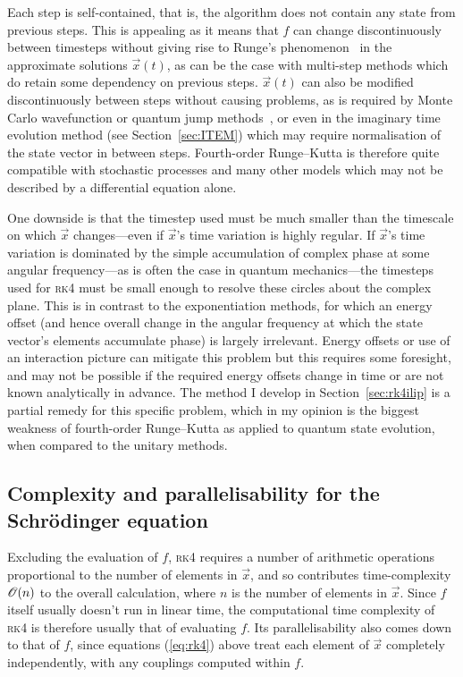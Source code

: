Each step is self-contained, that is, the algorithm does not contain any state from previous steps. This is appealing as it means that $f$ can change discontinuously between timesteps without giving rise to Runge's phenomenon~\cite{dahlquist2003numerical} in the approximate solutions $\vec x(t)$, as can be the case with multi-step methods which do retain some dependency on previous steps.
$\vec x(t)$ can also be modified discontinuously between steps without causing problems, as is required by Monte Carlo wavefunction or quantum jump methods~\cite{molmer_monte_1996, plenio_quantum-jump_1998}, or even in the imaginary time evolution method (see Section~\ref{sec:ITEM}) which may require normalisation of the state vector in between steps. Fourth-order Runge--Kutta is therefore quite compatible with stochastic processes and many other models which may not be described by a differential equation alone.

One downside is that the timestep used must be much smaller than the timescale on which $\vec x$ changes---even if $\vec x$'s time variation is highly regular. If $\vec x$'s time variation is dominated by the simple accumulation of complex phase at some angular frequency---as is often the case in quantum mechanics---the timesteps used for \textsc{rk4} must be small enough to resolve these circles about the complex plane. This is in contrast to the exponentiation methods, for which an energy offset (and hence overall change in the angular frequency at which the state vector's elements accumulate phase) is largely irrelevant. Energy offsets or use of an interaction picture can mitigate this problem but this requires some foresight, and may not be possible if the required energy offsets change in time or are not known analytically in advance. The method I develop in Section~\ref{sec:rk4ilip} is a partial remedy for this specific problem, which in my opinion is the biggest weakness of fourth-order Runge--Kutta as applied to quantum state evolution, when compared to the unitary methods.

\subsection{Complexity and parallelisability for the Schr\"odinger equation}

Excluding the evaluation of $f$, \textsc{rk4} requires a number of arithmetic operations proportional to the number of elements in $\vec x$, and so contributes time-complexity $\mathscr{O}(n)$ to the overall calculation, where $n$ is the number of elements in $\vec x$. Since $f$ itself usually doesn't run in linear time, the computational time complexity of \textsc{rk4} is therefore usually that of evaluating $f$. Its parallelisability also comes down to that of $f$, since equations (\ref{eq:rk4}) above treat each element of $\vec x$ completely independently, with any couplings computed within $f$.

